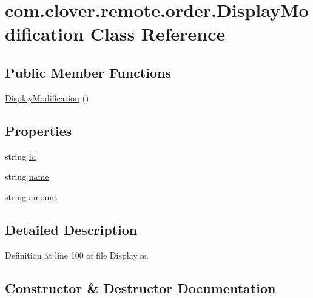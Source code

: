 \hypertarget{classcom_1_1clover_1_1remote_1_1order_1_1_display_modification}{}\section{com.\+clover.\+remote.\+order.\+Display\+Modification Class Reference}
\label{classcom_1_1clover_1_1remote_1_1order_1_1_display_modification}
\subsection*{Public Member Functions}
\begin{DoxyCompactItemize}
\item 
\hyperlink{classcom_1_1clover_1_1remote_1_1order_1_1_display_modification_aaeb0bae8bd8cbc0f29caf8a54e7ea77c}{Display\+Modification} ()
\end{DoxyCompactItemize}
\subsection*{Properties}
\begin{DoxyCompactItemize}
\item 
string \hyperlink{classcom_1_1clover_1_1remote_1_1order_1_1_display_modification_ad7be756b13262f06dcd46c2fd0dae83a}{id}
\item 
string \hyperlink{classcom_1_1clover_1_1remote_1_1order_1_1_display_modification_a034743d3e96712e47a62dda8b0463b50}{name}
\item 
string \hyperlink{classcom_1_1clover_1_1remote_1_1order_1_1_display_modification_a8c33755b2e3578cd57fc6580f5fb3e6f}{amount}
\end{DoxyCompactItemize}


\subsection{Detailed Description}


Definition at line 100 of file Display.\+cs.



\subsection{Constructor \& Destructor Documentation}
\mbox{\label{classcom_1_1clover_1_1remote_1_1order_1_1_display_modification_aaeb0bae8bd8cbc0f29caf8a54e7ea77c}} 
